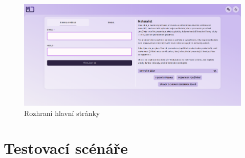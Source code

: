 \begin{figure}[ht!]
    \centering
    \includegraphics[width=1\textwidth,page=9]{media/appendix/uzivatelskeProstredi.pdf}
    \caption{Rozhraní hlavní stránky}
\end{figure}

\chapter{Testovací scénáře}\label{appendix:testovaciScenare}











